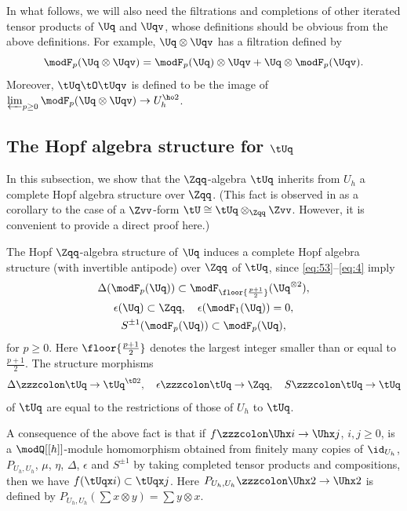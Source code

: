 \documentclass{amsart}
\numberwithin{equation}{section}
\numberwithin{figure}{section}
\theoremstyle{plain}
\theoremstyle{definition}
\theoremstyle{remark}
\begin{document}
In what follows, we will also need the filtrations and completions of
other iterated tensor products of $\Uq$ and $\Uqv$, whose definitions
should be obvious from the above definitions.  For example,
$\Uq\otimes \Uqv$ has a filtration defined by
\begin{equation*}
  \modF _p(\Uq\otimes \Uqv)=\modF _p(\Uq)\otimes \Uqv+\Uq\otimes \modF _p(\Uqv).
\end{equation*}
Moreover, $\tUq\tO\tUqv$ is defined to be the image of
$\varprojlim_{p\ge 0}\modF _p(\Uq\otimes \Uqv)\rightarrow U_h^{\ho2}$.

\subsection{The Hopf algebra structure for $\tUq$}
\label{sec:Hopf-algebra-structure}

In this subsection, we show that the $\Zqq$-algebra $\tUq$ inherits
from $U_h$ a complete Hopf algebra structure over $\Zqq$.  (This fact
is observed in \cite{H:uqsl2} as a corollary to the case of a
$\Zvv$-form $\tU\cong\tUq\otimes _{\Zqq}\Zvv$.  However, it is convenient to
provide a direct proof here.)

The Hopf $\Zqq$-algebra structure of $\Uq$ induces a complete Hopf
algebra structure (with invertible antipode) over $\Zqq$ of $\tUq$,
since \eqref{eq:53}--\eqref{eq:4} imply
\begin{gather*}
  \Delta (\modF _p(\Uq))\subset \modF _{\floor{\frac{p+1}2}}(\Uq^{\otimes 2}),\\
  \epsilon (\Uq)\subset \Zqq,\quad \epsilon (\modF _1(\Uq))=0, \\
  S^{\pm 1}(\modF _p(\Uq))\subset \modF _p(\Uq),
\end{gather*}
for $p\ge 0$.  Here $\floor{\frac{p+1}2}$ denotes the largest integer smaller
than or equal to $\frac{p+1}2$.  The structure morphisms
\begin{equation*}
  \Delta \zzzcolon \tUq\rightarrow \tUq^{\tO2},\quad \epsilon \zzzcolon \tUq\rightarrow \Zqq,\quad S\zzzcolon \tUq\rightarrow \tUq
\end{equation*}
of $\tUq$ are equal to the restrictions of those of $U_h$ to $\tUq$.

A consequence of the above fact is that if $f\zzzcolon \Uhx i\rightarrow \Uhx j$,
$i,j\ge 0$, is a $\modQ [[h]]$-module homomorphism obtained from finitely
many copies of $\id_{U_h}$, $P_{U_h,U_h}$, $\mu $, $\eta $, $\Delta $, $\epsilon $ and
$S^{\pm 1}$ by taking completed tensor products and compositions, then we
have $f(\tUqx i)\subset \tUqx j$.  Here $P_{U_h,U_h}\zzzcolon \Uhx2\rightarrow \Uhx2$ is
defined by $P_{U_h,U_h}(\sum x\otimes y)=\sum y\otimes x$.
\end{document}
